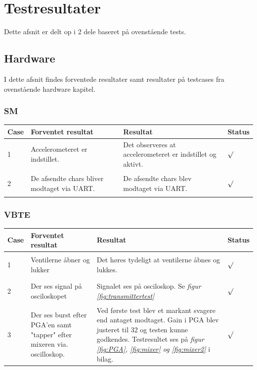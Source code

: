 \section{Testresultater}
Dette afsnit er delt op i  2 dele baseret på ovenstående tests.\\
\subsection{Hardware}
I dette afsnit findes forventede resultater samt resultater på testcases fra ovenstående hardware kapitel.\\
\subsubsection{SM}
\begin{table}[H]
\centering
\begin{tabular}{| p{1cm}  | p{4cm} | p{6cm} | p{1cm} |}
\hline
Case &Forventet resultat &Resultat &Status\\\hline
1 &Accelerometeret er indstillet. &Det observeres at accelerometeret er indstillet og aktivt. &\begin{Huge}$\surd$\end{Huge}\\\hline
2 &De afsendte chars bliver modtaget via UART. &De afsendte chars blev modtaget via UART. &\begin{Huge}$\surd$\end{Huge}\\\hline
\end{tabular}
\end{table}
\subsubsection{VBTE}
\begin{table}[H]
\centering
\begin{tabular}{| p{1cm}  | p{4cm} | p{6cm} | p{1cm} |}
\hline
Case &Forventet resultat &Resultat &Status\\\hline
1 &Ventilerne åbner og lukker &Det høres tydeligt at ventilerne åbnes og lukkes. &\begin{Huge}$\surd$\end{Huge} \\\hline 
2 &Der ses signal på osciloskopet &Signalet ses på osciloskop. Se \textit{figur \ref{fig:transmittertest}} &\begin{Huge}$\surd$\end{Huge} \\\hline 
3 & Der ses burst efter PGA'en samt "tapper" efter mixeren via. oscilloskop. & Ved første test blev et markant svagere end antaget modtaget. Gain i PGA blev justeret til 32 og testen kunne godkendes. Testresultet ses på \textit{figur \ref{fig:PGA}, \ref{fig:mixer} og \ref{fig:mixer2}} i bilag. &\begin{Huge}$\surd$\end{Huge} \\\hline 
\end{tabular}
\end{table}
\newpage
